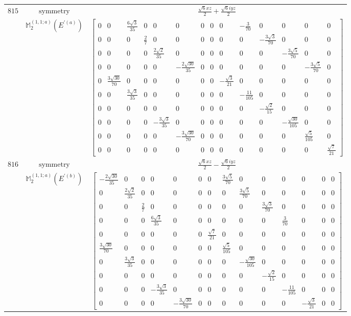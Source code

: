\documentclass[fleqn,8pt,landscape]{jsarticle}
\begin{document}
\begin{longtable}{ccc}
$ 815 $ & $ \text{symmetry} $ & $ \frac{\sqrt{6} x z}{2} + \frac{\sqrt{6} i y z}{2} $ \\
$  $ & $ \mathbb{M}_{2}^{(1,1;a)}(E^{\prime(a)}) $ & $ \begin{bmatrix} 0 & 0 & \frac{6 \sqrt{3}}{35} & 0 & 0 & 0 & 0 & 0 & 0 & - \frac{3}{70} & 0 & 0 & 0 & 0 \\ 0 & 0 & 0 & \frac{2}{7} & 0 & 0 & 0 & 0 & 0 & 0 & - \frac{3 \sqrt{3}}{70} & 0 & 0 & 0 \\ 0 & 0 & 0 & 0 & \frac{2 \sqrt{2}}{35} & 0 & 0 & 0 & 0 & 0 & 0 & - \frac{3 \sqrt{5}}{70} & 0 & 0 \\ 0 & 0 & 0 & 0 & 0 & - \frac{2 \sqrt{30}}{35} & 0 & 0 & 0 & 0 & 0 & 0 & - \frac{3 \sqrt{5}}{70} & 0 \\ 0 & \frac{3 \sqrt{30}}{70} & 0 & 0 & 0 & 0 & 0 & 0 & - \frac{\sqrt{3}}{21} & 0 & 0 & 0 & 0 & 0 \\ 0 & 0 & \frac{3 \sqrt{3}}{35} & 0 & 0 & 0 & 0 & 0 & 0 & - \frac{11}{105} & 0 & 0 & 0 & 0 \\ 0 & 0 & 0 & 0 & 0 & 0 & 0 & 0 & 0 & 0 & - \frac{\sqrt{2}}{15} & 0 & 0 & 0 \\ 0 & 0 & 0 & 0 & - \frac{3 \sqrt{3}}{35} & 0 & 0 & 0 & 0 & 0 & 0 & - \frac{\sqrt{30}}{105} & 0 & 0 \\ 0 & 0 & 0 & 0 & 0 & - \frac{3 \sqrt{30}}{70} & 0 & 0 & 0 & 0 & 0 & 0 & \frac{\sqrt{5}}{105} & 0 \\ 0 & 0 & 0 & 0 & 0 & 0 & 0 & 0 & 0 & 0 & 0 & 0 & 0 & \frac{\sqrt{7}}{21} \end{bmatrix} $ \\ \hline
$ 816 $ & $ \text{symmetry} $ & $ \frac{\sqrt{6} x z}{2} - \frac{\sqrt{6} i y z}{2} $ \\
$  $ & $ \mathbb{M}_{2}^{(1,1;a)}(E^{\prime(b)}) $ & $ \begin{bmatrix} - \frac{2 \sqrt{30}}{35} & 0 & 0 & 0 & 0 & 0 & 0 & \frac{3 \sqrt{5}}{70} & 0 & 0 & 0 & 0 & 0 & 0 \\ 0 & \frac{2 \sqrt{2}}{35} & 0 & 0 & 0 & 0 & 0 & 0 & \frac{3 \sqrt{5}}{70} & 0 & 0 & 0 & 0 & 0 \\ 0 & 0 & \frac{2}{7} & 0 & 0 & 0 & 0 & 0 & 0 & \frac{3 \sqrt{3}}{70} & 0 & 0 & 0 & 0 \\ 0 & 0 & 0 & \frac{6 \sqrt{3}}{35} & 0 & 0 & 0 & 0 & 0 & 0 & \frac{3}{70} & 0 & 0 & 0 \\ 0 & 0 & 0 & 0 & 0 & 0 & \frac{\sqrt{7}}{21} & 0 & 0 & 0 & 0 & 0 & 0 & 0 \\ \frac{3 \sqrt{30}}{70} & 0 & 0 & 0 & 0 & 0 & 0 & \frac{\sqrt{5}}{105} & 0 & 0 & 0 & 0 & 0 & 0 \\ 0 & \frac{3 \sqrt{3}}{35} & 0 & 0 & 0 & 0 & 0 & 0 & - \frac{\sqrt{30}}{105} & 0 & 0 & 0 & 0 & 0 \\ 0 & 0 & 0 & 0 & 0 & 0 & 0 & 0 & 0 & - \frac{\sqrt{2}}{15} & 0 & 0 & 0 & 0 \\ 0 & 0 & 0 & - \frac{3 \sqrt{3}}{35} & 0 & 0 & 0 & 0 & 0 & 0 & - \frac{11}{105} & 0 & 0 & 0 \\ 0 & 0 & 0 & 0 & - \frac{3 \sqrt{30}}{70} & 0 & 0 & 0 & 0 & 0 & 0 & - \frac{\sqrt{3}}{21} & 0 & 0 \end{bmatrix} $ \\ \hline

\end{longtable}
\end{document}
